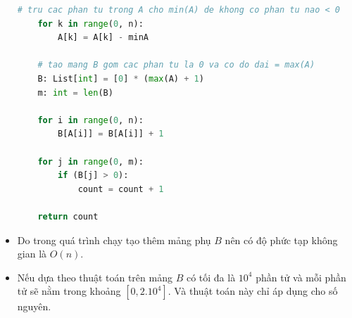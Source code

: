 \documentclass[12pt]{article}
\begin{document}
\begin{itemize}
\begin{lstlisting}[language=Python]
    # tru cac phan tu trong A cho min(A) de khong co phan tu nao < 0
    for k in range(0, n):
        A[k] = A[k] - minA

    # tao mang B gom cac phan tu la 0 va co do dai = max(A)
    B: List[int] = [0] * (max(A) + 1)
    m: int = len(B)

    for i in range(0, n):
        B[A[i]] = B[A[i]] + 1

    for j in range(0, m):
        if (B[j] > 0):
            count = count + 1

    return count
\end{lstlisting}

\item Do trong quá trình chạy tạo thêm mảng phụ $B$ nên có độ phức tạp không gian là $O(n)$. 

\item Nếu dựa theo thuật toán trên mảng $B$ có tối đa là $10^4$ phần tử và mỗi phần tử sẽ nằm trong khoảng $[0, 2.10^4]$. Và thuật toán này chỉ áp dụng cho số nguyên.

\end{itemize}

\vspace*{10pt}
\end{document}
